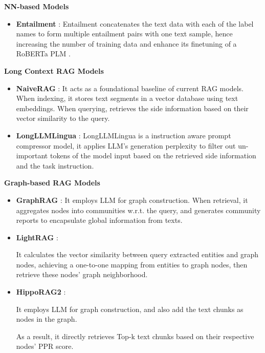 	\noindent \textbf{NN-based Models}
	\begin{itemize}[leftmargin=10pt]
		\item \textbf{Entailment} \cite{xia-etal-2021-incremental}: Entailment concatenates the text data with each of the label names to form multiple entailment pairs with one text sample, hence increasing the number of training data and enhance its finetuning of a RoBERTa PLM \cite{liu2019roberta}. 
		
		
		
		
		
	\end{itemize} 
	\noindent \textbf{Long Context RAG Models}
	\begin{itemize}[leftmargin=10pt]
		\item \textbf{NaiveRAG} \cite{gao2023retrieval}: It acts as a foundational baseline of current RAG models. When indexing, it stores text segments in a vector database using text embeddings. When querying, retrieves the side information based on their vector similarity to the query.
		
		\item \textbf{LongLLMLingua} \cite{jiang-etal-2024-longllmlingua}: LongLLMLingua is a instruction aware prompt compressor model, it applies LLM's generation perplexity to filter out un-important tokens of the model input based on the retrieved side information and the task instruction. 
		
		
	\end{itemize} 
	\noindent \textbf{Graph-based RAG Models}
	\begin{itemize}[leftmargin=10pt]
		\item \textbf{GraphRAG} \cite{edge2024local}: It employs LLM for graph construction. When retrieval, it aggregates nodes into communities w.r.t. the query, and generates community reports to encapsulate global information from texts.
		
		\item \textbf{LightRAG} \cite{guo2024lightrag}: 
		
		It calculates the vector similarity between query extracted entities and graph nodes, achieving a one-to-one mapping from entities to graph nodes, then retrieve these nodes' graph neighborhood.
		
		
		
		
		
		\item \textbf{HippoRAG2} \cite{gutiérrez2025ragmemory}: 
		
		It employs LLM for graph construction, and also add the text chunks as nodes in the graph.  
		
		As a result, it directly retrieves Top-k text chunks based on their respective nodes' PPR score.
	\end{itemize} 

